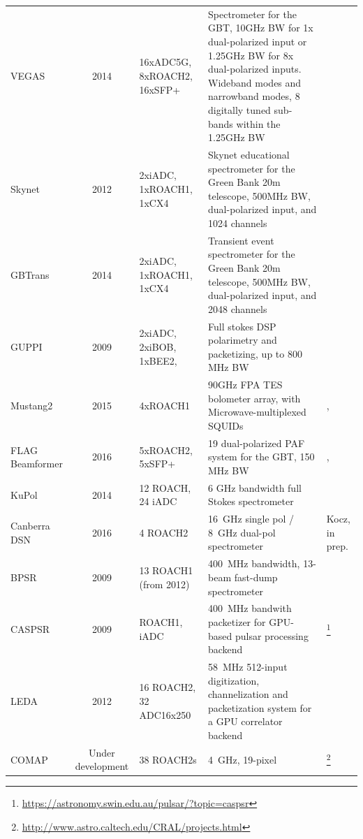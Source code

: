 \documentclass{ws-jai}
\begin{document}
\begin{landscape}
\begin{longtable}{p{3cm} c p{4cm} p{8cm} p{2cm}}
  VEGAS            & 2014 & 16xADC5G, 8xROACH2, 16xSFP+ & Spectrometer for the GBT, 10GHz BW for 1x dual-polarized input or 1.25GHz BW for 8x dual-polarized inputs. Wideband modes and narrowband modes, 8 digitally tuned sub-bands within the 1.25GHz BW & \cite{chennamangalam2014gpu} \\
  Skynet           & 2012 & 2xiADC, 1xROACH1, 1xCX4     & Skynet educational spectrometer for the Green Bank 20m telescope, 500MHz BW, dual-polarized input, and 1024 channels& \cite{skynet} \\
  GBTrans          & 2014 & 2xiADC, 1xROACH1, 1xCX4     & Transient event spectrometer for the Green Bank 20m telescope, 500MHz BW, dual-polarized input, and 2048 channels & \cite{gbtrans} \\
  GUPPI            & 2009 & 2xiADC, 2xiBOB, 1xBEE2,     & Full stokes DSP polarimetry and packetizing, up to 800 MHz BW                                                     & \cite{guppi} \\
  Mustang2         & 2015 & 4xROACH1                    & 90GHz FPA TES bolometer array, with Microwave-multiplexed SQUIDs                                                  & \cite{2016JLTP..184..460S} , \cite{2014JLTP..176..808D}  \\
  FLAG Beamformer  & 2016 & 5xROACH2, 5xSFP+            & 19 dual-polarized PAF system for the GBT,  150 MHz BW                                                             & \cite{gb_flag} , \cite{gb_beamformer} \\
  KuPol            & 2014 & 12 ROACH, 24 iADC & 6 GHz bandwidth full Stokes spectrometer & \cite{2013arXiv1303.2131M} \\
  Canberra DSN     & 2016 & 4 ROACH2 & 16~GHz single pol / 8~GHz dual-pol spectrometer & Kocz, in prep. \\
  BPSR             & 2009 & 13 ROACH1 (from 2012) & 400~MHz bandwidth, 13-beam fast-dump spectrometer & \cite{2010MNRAS.409..619K} \\
  CASPSR           & 2009 & ROACH1, iADC & 400~MHz bandwith packetizer for GPU-based pulsar processing backend & \footnote{\url{https://astronomy.swin.edu.au/pulsar/?topic=caspsr}} \\
  LEDA             & 2012 & 16 ROACH2, 32 ADC16x250 & 58~MHz 512-input digitization, channelization and packetization system for a GPU correlator backend & \cite{doi:10.1142/S2251171715500038}\\
  COMAP            & Under development & 38 ROACH2s & 4~GHz, 19-pixel & \footnote{\url{http://www.astro.caltech.edu/CRAL/projects.html}} \\

\end{longtable}
\end{landscape}
\end{document}
